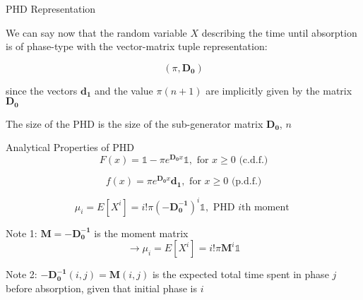 \documentclass[envcountset]{beamer}
\theoremstyle{definition}
\begin{document}
\begin{frame}{PHD Representation}

We can say now that the random variable $X$ describing the time until absorption is of phase-type with the vector-matrix tuple representation:

$$(\pi, \mathbf{D_0})$$

since the vectors $\mathbf{d_1}$ and the value $\pi(n+1)$ are implicitly given by the matrix $\mathbf{D_0}$

\vspace{10pt}
The size of the PHD is the size of the sub-generator matrix $\mathbf{D_0}$, $n$

\end{frame}

\begin{frame}{Analytical Properties of PHD}
$$F(x) = \mathbb{1} - \pi e^{\mathbf{D_0}x}\mathbb{1}, \text{ for }  x \geq 0 \text{ (c.d.f.)}$$

$$f(x) = \pi e^{\mathbf{D_0}x}\mathbf{d_1}, \text{ for }  x \geq 0 \text{   (p.d.f.)}$$

$$\mu_i=E[X^i]=i ! \pi \mathbf{(-D_0^{-1})}^i \mathbb{1}, \text{ PHD $i$th moment } $$

\vspace{10pt}

Note 1: $\mathbf{M} = \mathbf{-D_0^{-1}}$ is the moment matrix
$$\rightarrow \mu_i=E[X^i]=i ! \pi \mathbf{\mathbf{M}}^i \mathbb{1}$$

Note 2: $\mathbf{-D_0^{-1}}(i,j)=\mathbf{M}(i,j)$ is the expected total time spent in phase $j$ before absorption, given that initial phase is $i$

\end{frame}
\end{document}
